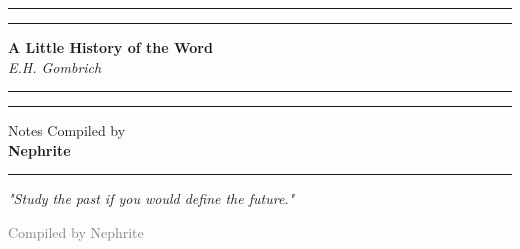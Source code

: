 \documentclass{book}
\newcommand{\booktitle}{A Little History of the Word}
\newcommand{\authorname}{E.H. Gombrich}
\newcommand{\yourname}{Nephrite}
\begin{document}

\begin{titlepage}
    \begin{center}
        \vspace*{2cm}

        \hrule height 3pt \vspace{2pt} \hrule height 1pt width 0.4\textwidth \vspace{1cm}

        {\Huge \textbf{\textcolor{coverblue}{\booktitle}}}\\[0.5cm]

        {\LARGE \textit{\textcolor{textgray}{\authorname}}}\\[1cm]

        \hrule height 1pt \vspace{2pt} \hrule height 3pt \vspace{3cm}

        {\Large \textcolor{textgray}{Notes Compiled by}}\\[0.5cm]
        {\LARGE \textbf{\yourname}}\\[2cm]

        \vfill
        \hrule height 1pt width 0.25\textwidth
    \end{center}
\end{titlepage}

\tableofcontents
\newpage




\newpage
\begin{titlepage}
\begin{center}
\vfill


{\Large\textit{"Study the past if you would define the future."}}

\vfil

\textcolor{gray}{\large Compiled by \yourname}
\vspace{1cm}


\vfill
\end{center}
\end{titlepage}
\end{document}
